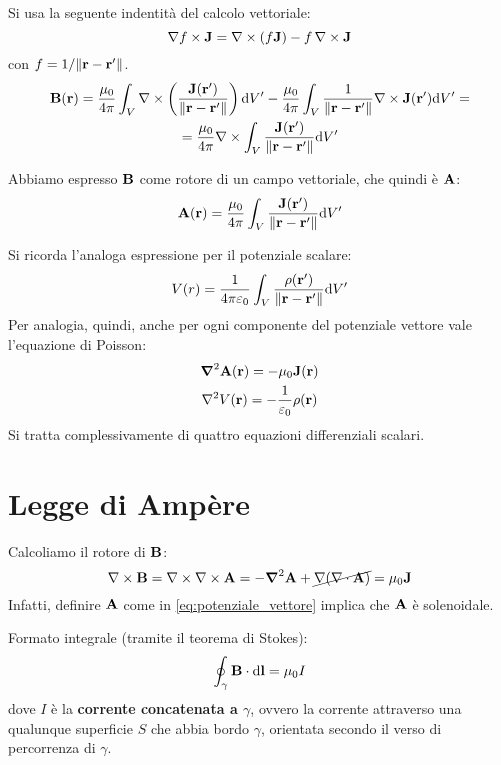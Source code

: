 Si usa la seguente indentità del calcolo vettoriale:
\begin{equation}
    \nabla f \times \mathbf{J} = \nabla \times (f \mathbf{J})  - f \, \nabla \times \mathbf{J}
\end{equation}
con $f = 1/{\left\lVert \mathbf{r} - \mathbf{r}' \right\rVert}$.
\begin{gather}
    \mathbf{B}(\mathbf{r}) =
    \frac{\mu_0}{4\pi} \int_V \nabla \times \left( \frac{\mathbf{J}(\mathbf{r}')}{\left\lVert \mathbf{r} - \mathbf{r}' \right\rVert} \right) \mathrm{d} V' -
    \frac{\mu_0}{4\pi} \int_V \frac{1}{\left\lVert \mathbf{r} - \mathbf{r}' \right\rVert} \nabla \times \mathbf{J}(\mathbf{r}') \mathrm{d} V' = \\
    = \frac{\mu_0}{4\pi} \nabla \times \int_V \frac{\mathbf{J}(\mathbf{r}')}{\left\lVert \mathbf{r} - \mathbf{r}' \right\rVert} \mathrm{d} V'
\end{gather}

Abbiamo espresso $\mathbf{B}$ come rotore di un campo vettoriale, che quindi è $\mathbf{A}$:
\begin{equation}
\label{eq:potenziale_vettore}
    \mathbf{A}(\mathbf{r}) = \frac{\mu_0}{4\pi} \int_V \frac{\mathbf{J}(\mathbf{r}')}{\left\lVert \mathbf{r} - \mathbf{r}' \right\rVert} \mathrm{d} V'
\end{equation}

Si ricorda l'analoga espressione per il potenziale scalare:
\begin{equation}
    V(r) = \frac{1}{4\pi \varepsilon_0} \int_V \frac{\rho(\mathbf{r}')}{\left\lVert \mathbf{r} - \mathbf{r}' \right\rVert} \mathrm{d} V'
\end{equation}
Per analogia, quindi, anche per ogni componente del potenziale vettore vale l'equazione di Poisson:
\begin{gather}
    \boldsymbol{\nabla}^2 \mathbf{A}(\mathbf{r}) = - \mu_0 \mathbf{J}(\mathbf{r}) \\
    \nabla^2 V(\mathbf{r}) = - \frac{1}{\varepsilon_0} \rho(\mathbf{r})
\end{gather}
Si tratta complessivamente di quattro equazioni differenziali scalari.

\section{Legge di Ampère}

Calcoliamo il rotore di $\mathbf{B}$:
\begin{equation}
    \nabla \times \mathbf{B} = \nabla \times \nabla \times \mathbf{A} = - \boldsymbol{\nabla}^2 \mathbf{A} + \cancel{\nabla (\nabla \cdot \mathbf{A})} = \mu_0 \mathbf{J}
\end{equation}
Infatti, definire $\mathbf{A}$ come in \eqref{eq:potenziale_vettore} implica che $\mathbf{A}$ è solenoidale.

Formato integrale (tramite il teorema di Stokes):
\begin{equation}
\label{eq:legge_di_ampere}
    \oint_\gamma \mathbf{B} \cdot \mathrm{d} \mathbf{l} = \mu_0 I
\end{equation}
dove $I$ è la \textbf{corrente concatenata a $\gamma$}, ovvero la corrente attraverso una qualunque superficie $S$ che abbia bordo $\gamma$, orientata secondo il verso di percorrenza di $\gamma$.

